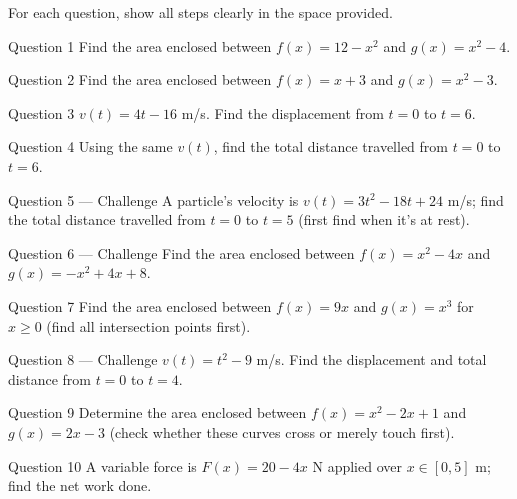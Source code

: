 \documentclass[11pt]{article}
\begin{document}
\clearpage
{}
For each question, show all steps clearly in the space provided.

\begin{qbox}{Question 1}
Find the area enclosed between $f(x)=12-x^2$ and $g(x)=x^2-4$.\workspace{2.4cm}
\end{qbox}

\begin{qbox}{Question 2}
Find the area enclosed between $f(x)=x+3$ and $g(x)=x^2-3$.\workspace{2.4cm}
\end{qbox}

\begin{qbox}{Question 3}
$v(t)=4t-16$ m/s. Find the displacement from $t=0$ to $t=6$.\workspace{2.4cm}
\end{qbox}

\begin{qbox}{Question 4}
Using the same $v(t)$, find the total distance travelled from $t=0$ to $t=6$.\workspace{2.4cm}
\end{qbox}

\begin{qbox}{Question 5 --- Challenge}
A particle's velocity is $v(t)=3t^2-18t+24$ m/s; find the total distance travelled from $t=0$ to $t=5$ (first find when it's at rest).\workspace{3.6cm}
\end{qbox}

\begin{qbox}{Question 6 --- Challenge}
Find the area enclosed between $f(x)=x^2-4x$ and $g(x)=-x^2+4x+8$.\workspace{3.4cm}
\end{qbox}

\begin{qbox}{Question 7}
Find the area enclosed between $f(x)=9x$ and $g(x)=x^3$ for $x\geq0$ (find all intersection points first).\workspace{2.4cm}
\end{qbox}

\begin{qbox}{Question 8 --- Challenge}
$v(t)=t^2-9$ m/s. Find the displacement and total distance from $t=0$ to $t=4$.\workspace{3.4cm}
\end{qbox}

\begin{qbox}{Question 9}
Determine the area enclosed between $f(x)=x^2-2x+1$ and $g(x)=2x-3$ (check whether these curves cross or merely touch first).\workspace{2.4cm}
\end{qbox}

\begin{qbox}{Question 10}
A variable force is $F(x)=20-4x$ N applied over $x\in[0,5]$ m; find the net work done.\workspace{2.4cm}
\end{qbox}
\end{document}
